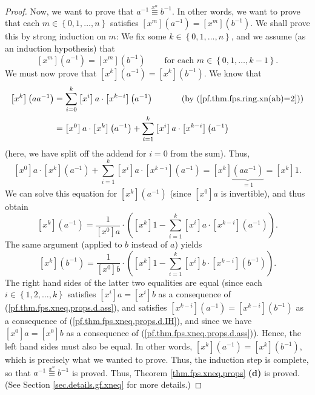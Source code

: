 \begin{proof}
Now, we want to prove that $a^{-1}\overset{x^{n}}{\equiv}b^{-1}$. In other
words, we want to prove that each $m\in\left\{  0,1,\ldots,n\right\}  $
satisfies $\left[  x^{m}\right]  \left(  a^{-1}\right)  =\left[  x^{m}\right]
\left(  b^{-1}\right)  $. We shall prove this by strong induction on $m$: We
fix some $k\in\left\{  0,1,\ldots,n\right\}  $, and we assume (as an induction
hypothesis) that
\begin{equation}
\left[  x^{m}\right]  \left(  a^{-1}\right)  =\left[  x^{m}\right]  \left(
b^{-1}\right)  \ \ \ \ \ \ \ \ \ \ \text{for each }m\in\left\{  0,1,\ldots
,k-1\right\}  . \label{pf.thm.fps.xneq.props.d.IH}%
\end{equation}
We must now prove that $\left[  x^{k}\right]  \left(  a^{-1}\right)  =\left[
x^{k}\right]  \left(  b^{-1}\right)  $. We know that%
\begin{align*}
\left[  x^{k}\right]  \left(  aa^{-1}\right)   &  =\sum_{i=0}^{k}\left[
x^{i}\right]  a\cdot\left[  x^{k-i}\right]  \left(  a^{-1}\right)
\ \ \ \ \ \ \ \ \ \ \left(  \text{by (\ref{pf.thm.fps.ring.xn(ab)=2})}\right)
\\
&  =\left[  x^{0}\right]  a\cdot\left[  x^{k}\right]  \left(  a^{-1}\right)
+\sum_{i=1}^{k}\left[  x^{i}\right]  a\cdot\left[  x^{k-i}\right]  \left(
a^{-1}\right)
\end{align*}
(here, we have split off the addend for $i=0$ from the sum). Thus,%
\[
\left[  x^{0}\right]  a\cdot\left[  x^{k}\right]  \left(  a^{-1}\right)
+\sum_{i=1}^{k}\left[  x^{i}\right]  a\cdot\left[  x^{k-i}\right]  \left(
a^{-1}\right)  =\left[  x^{k}\right]  \underbrace{\left(  aa^{-1}\right)
}_{=1}=\left[  x^{k}\right]  1.
\]
We can solve this equation for $\left[  x^{k}\right]  \left(  a^{-1}\right)  $
(since $\left[  x^{0}\right]  a$ is invertible), and thus obtain%
\[
\left[  x^{k}\right]  \left(  a^{-1}\right)  =\dfrac{1}{\left[  x^{0}\right]
a}\cdot\left(  \left[  x^{k}\right]  1-\sum_{i=1}^{k}\left[  x^{i}\right]
a\cdot\left[  x^{k-i}\right]  \left(  a^{-1}\right)  \right)  .
\]
The same argument (applied to $b$ instead of $a$) yields%
\[
\left[  x^{k}\right]  \left(  b^{-1}\right)  =\dfrac{1}{\left[  x^{0}\right]
b}\cdot\left(  \left[  x^{k}\right]  1-\sum_{i=1}^{k}\left[  x^{i}\right]
b\cdot\left[  x^{k-i}\right]  \left(  b^{-1}\right)  \right)  .
\]
The right hand sides of the latter two equalities are equal (since each
$i\in\left\{  1,2,\ldots,k\right\}  $ satisfies $\left[  x^{i}\right]
a=\left[  x^{i}\right]  b$ as a consequence of
(\ref{pf.thm.fps.xneq.props.d.ass}), and satisfies $\left[  x^{k-i}\right]
\left(  a^{-1}\right)  =\left[  x^{k-i}\right]  \left(  b^{-1}\right)  $ as a
consequence of (\ref{pf.thm.fps.xneq.props.d.IH}), and since we have $\left[
x^{0}\right]  a=\left[  x^{0}\right]  b$ as a consequence of
(\ref{pf.thm.fps.xneq.props.d.ass})). Hence, the left hand sides must also be
equal. In other words, $\left[  x^{k}\right]  \left(  a^{-1}\right)  =\left[
x^{k}\right]  \left(  b^{-1}\right)  $, which is precisely what we wanted to
prove. Thus, the induction step is complete, so that $a^{-1}\overset{x^{n}%
}{\equiv}b^{-1}$ is proved. Thus, Theorem \ref{thm.fps.xneq.props}
\textbf{(d)} is proved. (See Section \ref{sec.details.gf.xneq} for more details.)
\end{proof}

